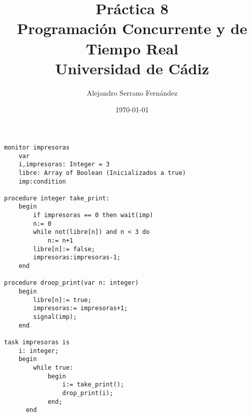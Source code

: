 \documentclass{article}
\title{Práctica 8 \\ Programación Concurrente y de Tiempo Real \\Universidad de Cádiz} %
\author{Alejandro Serrano Fernández} %
\date{\today} %
\begin{document}
\maketitle %

\begin{lstlisting}
monitor impresoras
	var
	i,impresoras: Integer = 3
	libre: Array of Boolean (Inicializados a true)
	imp:condition

procedure integer take_print:
	begin
		if impresoras == 0 then wait(imp)
		n:= 0
		while not(libre[n]) and n < 3 do
			n:= n+1
		libre[n]:= false;
		impresoras:impresoras-1;
	end

procedure droop_print(var n: integer)
	begin
		libre[n]:= true;
		impresoras:= impresoras+1;
		signal(imp);
	end

task impresoras is
	i: integer;
	begin
		while true:
			begin
				i:= take_print();
				drop_print(i);
			end;
	  end

\end{lstlisting}
\end{document}
